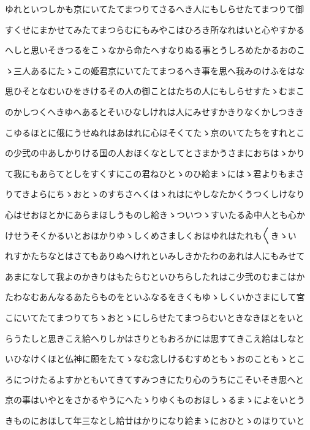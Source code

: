 \documentclass[a4paper,11pt,landscape]{ltjtarticle}
\begin{document}
\par\medskip
ゆれといつしかも京にいてたてまつりてさるへき人にもしらせたてまつりて御
\par\medskip
すくせにまかせてみたてまつらむにもみやこはひろき所なれはいと心やすかる
\par\medskip
へしと思いそきつるをこゝなから命たへすなりぬる事とうしろめたかるおのこ
\par\medskip
ゝ三人あるにたゝこの姫君京にいてたてまつるへき事を思へ我みのけふをはな
\par\medskip
思ひそとなむいひをきけるその人の御ことはたちの人にもしらせすたゝむまこ
\par\medskip
のかしつくへきゆへあるとそいひなしけれは人にみせすかきりなくかしつきき
\par\medskip
こゆるほとに俄にうせぬれはあはれに心ほそくてたゝ京のいてたちをすれとこ
\par\medskip
の少弐の中あしかりける国の人おほくなとしてとさまかうさまにおちはゝかり
\par\medskip
て我にもあらてとしをすくすにこの君ねひとゝのひ給まゝにはゝ君よりもまさ
\par\medskip
りてきよらにちゝおとゝのすちさへくはゝれはにやしなたかくうつくしけなり
\par\medskip
心はせおほとかにあらまほしうものし給きゝついつゝすいたるゐ中人とも心か
\par\medskip
けせうそくかるいとおほかりゆゝしくめさましくおほゆれはたれも〱きゝい
\par\medskip
れすかたちなとはさてもありぬへけれといみしきかたわのあれは人にもみせて
\par\medskip
あまになして我よのかきりはもたらむといひちらしたれはこ少弐のむまこはか
\par\medskip
たわなむあんなるあたらものをといふなるをきくもゆゝしくいかさまにして宮
\par\medskip
こにいてたてまつりてちゝおとゝにしらせたてまつらむいときなきほとをいと
\par\medskip
らうたしと思きこえ給へりしかはさりともおろかには思すてきこえ給はしなと
\par\medskip
いひなけくほと仏神に願をたてゝなむ念しけるむすめともゝおのこともゝとこ
\par\medskip
ろにつけたるよすかともいてきてすみつきにたり心のうちにこそいそき思へと
\par\medskip
京の事はいやとをさかるやうにへたゝりゆくものおほしゝるまゝによをいとう
\par\medskip
きものにおほして年三なとし給廿はかりになり給まゝにおひとゝのほりていと
\end{document}
